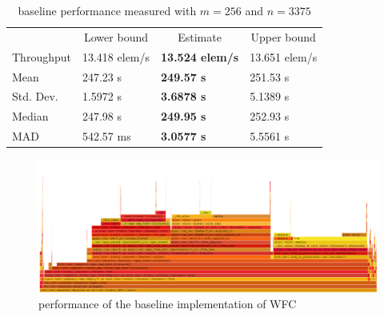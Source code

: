 \documentclass[shortabstract, english, inz]{iithesis}
\begin{document}
\begin{table}[]
\centering
\begin{tabular}{llll}
\multicolumn{1}{c}{} & \multicolumn{1}{c}{Lower bound} & \multicolumn{1}{c}{Estimate} & \multicolumn{1}{c}{Upper bound} \\
Throughput           & 13.418 elem/s                   & \textbf{13.524 elem/s}                & 13.651 elem/s                   \\
Mean                 & 247.23 s                        & \textbf{249.57 s}                     & 251.53 s                        \\
Std. Dev.            & 1.5972 s                        & \textbf{3.6878 s}                     & 5.1389 s                        \\
Median               & 247.98 s                        & \textbf{249.95 s}                     & 252.93 s                        \\
MAD                  & 542.57 ms                       & \textbf{3.0577 s}                     & 5.5561 s
\end{tabular}
\caption{baseline performance measured with \(m=256\) and \(n=3375\)}
\label{table:baseline}
\end{table}

\begin{figure}[H]
\centering
\includegraphics[width=1\textwidth, angle=0]{images/baseline_flamegraph.png}
\caption{performance of the baseline implementation of WFC}
\label{fig:baseline_flamegraph}
\end{figure}
\end{document}
